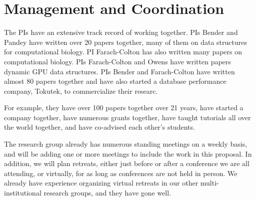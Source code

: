 \section*{Management and Coordination}




The PIs have an extensive track record of working together.  PIs Bender and Pandey have written over 20 papers together, many of them on data structures for computational biology.  PI Farach-Colton has also written many papers on computational biology.  PIs Farach-Colton and Owens have written papers dynamic GPU data structures.  PIs Bender and Farach-Colton have written almost 80 papers together and have also started a database performance company, Tokutek, to commercialize their researc.


For example, they have over 100 papers together over 21 years, have started a company together, have numerous grants together, have taught tutorials all over the world together, and have co-advised each other's students.  %

The research group already has numerous standing meetings on a weekly basis, and will be adding one or more meetings to include the work in this proposal.  In addition, we will plan retreats, either just before or after a conference we are all attending, or virtually, for as long as conferences are not held in person.  We already have experience organizing virtual retreats in our other multi-institutional research groups, and they have gone well.%